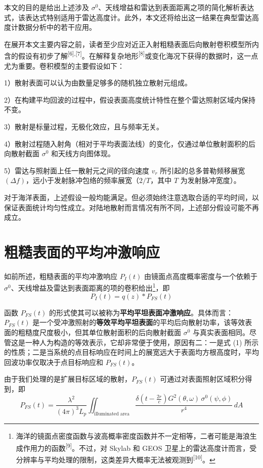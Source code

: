 本文的目的是给出上述涉及 $\sigma^{0}$、天线增益和雷达到表面距离之项的简化解析表达式，该表达式特别适用于雷达高度计。此外，本文还将给出这一结果在典型雷达高度计数据分析中的若干应用。

在展开本文主要内容之前，读者至少应对近正入射粗糙表面后向散射卷积模型所内含的假设有初步了解\textsuperscript{[6],[7]}。在解释复杂地形\textsuperscript{[8]}或变化海况下获得的数据时，这一点尤为重要。卷积模型的主要假设如下：

1）散射表面可以认为由数量足够多的随机独立散射元组成。

2）在构建平均回波的过程中，假设表面高度统计特性在整个雷达照射区域内保持不变。

3）散射是标量过程，无极化效应，且与频率无关。

4）散射过程随入射角（相对于平均表面法线）的变化，仅通过单位散射面积的后向散射截面 $\sigma^{0}$ 和天线方向图体现。

5）雷达与照射面上任一散射元之间的径向速度 $v_{r}$ 所引起的总多普勒频移展宽 $(\Delta f)$，远小于发射脉冲包络的频率展宽（$2/T$，其中 $T$ 为发射脉冲宽度）。

对于海洋表面，上述假设一般均能满足。但必须始终注意选取合适的平均时间，以保证表面统计均匀性成立。对陆地散射而言情况有所不同，上述部分假设可能不再成立。

\section{粗糙表面的平均冲激响应}
\seccontent
如前所述，粗糙表面的平均冲激响应 $P_{I}(t)$ 由镜面点高度概率密度与一个依赖于 $\sigma^{0}$、天线增益及雷达到表面距离的项的卷积给出\footnote{海洋的镜面点密度函数与波高概率密度函数并不一定相等，二者可能是海浪生成作用力的函数\textsuperscript{[9]}。不过，对 Skylab 和 GEOS 卫星上的雷达高度计而言，受分辨率与平均处理的限制，这类差异大概率无法被观测到\textsuperscript{[10]}。}，即
\[
P_{I}(t) = q(z)*P_{FS}(t)
\tag{1}
\]

函数 $P_{FS}(t)$ 的形式使其可以被称为\textbf{平均平坦表面冲激响应}。具体而言：$P_{FS}(t)$ 是一个受冲激照射的\textbf{等效平均平坦表面}的平均后向散射功率，该等效表面的粗糙度尺度极小，但其单位散射面积的后向散射截面 $\sigma^{0}$ 与真实表面相同。尽管这是一种人为构造的等效表示，它却非常便于使用，原因有二：一是式 (1) 所示的性质；二是当系统的点目标响应在时间上的展宽远大于表面均方根高度时，平均回波功率仅取决于点目标响应和 $P_{FS}(t)$。

由于我们处理的是扩展目标区域的散射，$P_{FS}(t)$ 可通过对表面照射区域积分得到，即
\[
P_{FS}(t) = \frac{\lambda^{2}}{(4\pi)^{3}L_{p}}\iint_{\text{illuminated area}}\frac{\delta\!\left(t - \frac{2r}{c}\right)G^{2}(\theta,\omega)\,\sigma^{0}(\psi,\phi)}{r^{4}}\,dA
\tag{2}
\]

